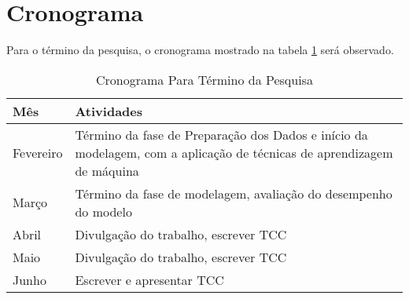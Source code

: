 \section{Cronograma}
Para o término da pesquisa, o cronograma mostrado na tabela \ref{cronograma} será
observado.
\begin{table}[htb]
\begin{center}
    \begin{tabular}[c]{| p{5cm} | p{10cm} |}
    \hline
    \textbf{Mês} & \textbf{Atividades} \\
    \hline
    Fevereiro & Término da fase de Preparação dos Dados e início da modelagem, com a
    aplicação de técnicas de aprendizagem de máquina \\
    \hline
    Março & Término da fase de modelagem, avaliação do desempenho do modelo\\
    \hline
    Abril & Divulgação do trabalho, escrever TCC \\
    \hline
    Maio & Divulgação do trabalho, escrever TCC \\
    \hline
    Junho & Escrever e apresentar TCC \\
    \hline
\end{tabular}
\end{center}
\caption{Cronograma Para Término da Pesquisa}
\label{cronograma}
\end{table}

